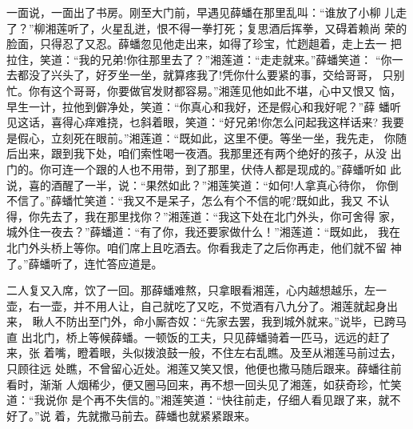 一面说，一面出了书房。刚至大门前，早遇见薛蟠在那里乱叫：“谁放了小柳
儿走了？”柳湘莲听了，火星乱迸，恨不得一拳打死；复思酒后挥拳，又碍着赖尚
荣的脸面，只得忍了又忍。薛蟠忽见他走出来，如得了珍宝，忙趔趄着，走上去一
把拉住，笑道：“我的兄弟!你往那里去了？”湘莲道：“走走就来。”薛蟠笑道：
“你一去都没了兴头了，好歹坐一坐，就算疼我了!凭你什么要紧的事，交给哥哥，
只别忙。你有这个哥哥，你要做官发财都容易。”湘莲见他如此不堪，心中又恨又
恼，早生一计，拉他到僻净处，笑道：“你真心和我好，还是假心和我好呢？”薛
蟠听见这话，喜得心痒难挠，乜斜着眼，笑道：“好兄弟!你怎么问起我这样话来?
我要是假心，立刻死在眼前。”湘莲道：“既如此，这里不便。等坐一坐，我先走，
你随后出来，跟到我下处，咱们索性喝一夜酒。我那里还有两个绝好的孩子，从没
出门的。你可连一个跟的人也不用带，到了那里，伏侍人都是现成的。”薛蟠听如
此说，喜的酒醒了一半，说：“果然如此？”湘莲笑道：“如何!人拿真心待你，
你倒不信了。”薛蟠忙笑道：“我又不是呆子，怎么有个不信的呢?既如此，我又
不认得，你先去了，我在那里找你？”湘莲道：“我这下处在北门外头，你可舍得
家，城外住一夜去？”薛蟠道：“有了你，我还要家做什么！”湘莲道：“既如此，
我在北门外头桥上等你。咱们席上且吃酒去。你看我走了之后你再走，他们就不留
神了。”薛蟠听了，连忙答应道是。

二人复又入席，饮了一回。那薛蟠难熬，只拿眼看湘莲，心内越想越乐，左一
壶，右一壶，并不用人让，自己就吃了又吃，不觉酒有八九分了。湘莲就起身出来，
瞅人不防出至门外，命小厮杏奴：“先家去罢，我到城外就来。”说毕，已跨马直
出北门，桥上等候薛蟠。一顿饭的工夫，只见薛蟠骑着一匹马，远远的赶了来，张
着嘴，瞪着眼，头似拨浪鼓一般，不住左右乱瞧。及至从湘莲马前过去，只顾往远
处瞧，不曾留心近处。湘莲又笑又恨，他便也撒马随后跟来。薛蟠往前看时，渐渐
人烟稀少，便又圈马回来，再不想一回头见了湘莲，如获奇珍，忙笑道：“我说你
是个再不失信的。”湘莲笑道：“快往前走，仔细人看见跟了来，就不好了。”说
着，先就撒马前去。薛蟠也就紧紧跟来。


